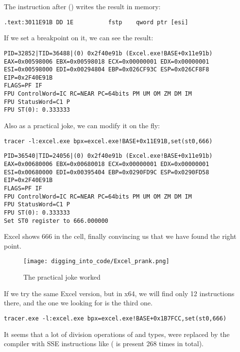 The instruction after \FDIV () writes the result in memory:\\

\begin{lstlisting}[style=customasm]
.text:3011E91B DD 1E          fstp    qword ptr [esi]
\end{lstlisting}

If we set a breakpoint on it, we can see the result:

\begin{lstlisting}
PID=32852|TID=36488|(0) 0x2f40e91b (Excel.exe!BASE+0x11e91b)
EAX=0x00598006 EBX=0x00598018 ECX=0x00000001 EDX=0x00000001
ESI=0x00598000 EDI=0x00294804 EBP=0x026CF93C ESP=0x026CF8F8
EIP=0x2F40E91B
FLAGS=PF IF
FPU ControlWord=IC RC=NEAR PC=64bits PM UM OM ZM DM IM 
FPU StatusWord=C1 P 
FPU ST(0): 0.333333
\end{lstlisting}

Also as a practical joke, we can modify it on the fly:

\begin{lstlisting}
tracer -l:excel.exe bpx=excel.exe!BASE+0x11E91B,set(st0,666)
\end{lstlisting}

\begin{lstlisting}
PID=36540|TID=24056|(0) 0x2f40e91b (Excel.exe!BASE+0x11e91b)
EAX=0x00680006 EBX=0x00680018 ECX=0x00000001 EDX=0x00000001
ESI=0x00680000 EDI=0x00395404 EBP=0x0290FD9C ESP=0x0290FD58
EIP=0x2F40E91B
FLAGS=PF IF
FPU ControlWord=IC RC=NEAR PC=64bits PM UM OM ZM DM IM 
FPU StatusWord=C1 P 
FPU ST(0): 0.333333
Set ST0 register to 666.000000
\end{lstlisting}

Excel shows 666 in the cell, finally convincing us that we have found the right point.

\begin{figure}[H]
\centering
\texttt{[image: digging\_into\_code/Excel\_prank.png]}
\caption{The practical joke worked}
\end{figure}

If we try the same Excel version, but in x64,
we will find only 12 \FDIV instructions there,
and the one we looking for is the third one.

\begin{lstlisting}
tracer.exe -l:excel.exe bpx=excel.exe!BASE+0x1B7FCC,set(st0,666)
\end{lstlisting}


It seems that a lot of division operations of \Tfloat and \Tdouble types, were replaced by the compiler with SSE instructions
like  ( is present 268 times in total).
